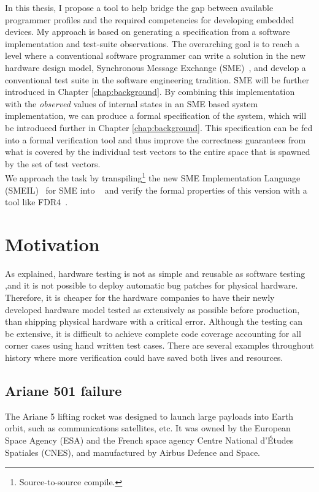 In this thesis, I propose a tool to help bridge the gap between available programmer profiles and the required competencies for developing embedded devices. My approach is based on generating a specification from a software implementation and test-suite observations. The overarching goal is to reach a level where a conventional software programmer can write a solution in the new hardware design model, Synchronous Message Exchange (SME)~\cite{Vinter2014, Vinter2015, Skovhede}, and develop a conventional test suite in the software engineering tradition. SME will be further introduced in Chapter \ref{chap:background}. By combining this implementation with the \emph{observed} values of internal states in an SME based system implementation, we can produce a formal specification of the system, which will be introduced further in Chapter \ref{chap:background}.
This specification can be fed into a formal verification tool and thus improve the correctness guarantees from what is covered by the individual test vectors to the entire space that is spawned by the set of test vectors.\\

We approach the task by transpiling\footnote{Source-to-source compile.} the new SME Implementation Language (SMEIL)~\cite{smeil} for SME into \cspm{}~\cite{Scattergood1998} and verify the formal properties of this version with a tool like FDR4~\cite{fdr}.
\section{Motivation}
As explained, hardware testing is not as simple and reusable as software testing ,and it is not possible to deploy automatic bug patches for physical hardware. Therefore, it is cheaper for the hardware companies to have their newly developed hardware model tested as extensively as possible before production, than shipping physical hardware with a critical error. Although the testing can be extensive, it is difficult to achieve complete code coverage accounting for all corner cases using hand written test cases. There are several examples throughout history where more verification could have saved both lives and resources.
\subsection{Ariane 501 failure}
The Ariane 5 lifting rocket\cite{InquiryBoard1996} was designed to launch large payloads into Earth orbit, such as communications satellites, etc. It was owned by the European Space Agency (ESA) and the French space agency Centre National d'\'Etudes Spatiales (CNES), and manufactured by Airbus Defence and Space.\\


